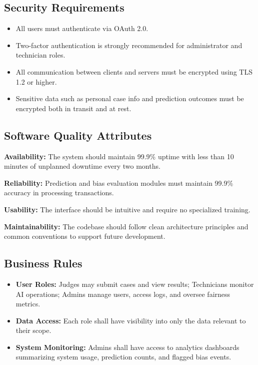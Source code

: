 \documentclass[12pt]{article}
\begin{document}
\subsection{Security Requirements}
\begin{itemize}
    \item All users must authenticate via OAuth 2.0.
    \item Two-factor authentication is strongly recommended for administrator and technician roles.
    \item All communication between clients and servers must be encrypted using TLS 1.2 or higher.
    \item Sensitive data such as personal case info and prediction outcomes must be encrypted both in transit and at rest.
\end{itemize}

\subsection{Software Quality Attributes}
\textbf{Availability:} The system should maintain 99.9\% uptime with less than 10 minutes of unplanned downtime every two months.

\textbf{Reliability:} Prediction and bias evaluation modules must maintain 99.9\% accuracy in processing transactions.

\textbf{Usability:} The interface should be intuitive and require no specialized training.

\textbf{Maintainability:} The codebase should follow clean architecture principles and common conventions to support future development.

\subsection{Business Rules}
\begin{itemize}
    \item \textbf{User Roles:} Judges may submit cases and view results; Technicians monitor AI operations; Admins manage users, access logs, and oversee fairness metrics.
    \item \textbf{Data Access:} Each role shall have visibility into only the data relevant to their scope.
    \item \textbf{System Monitoring:} Admins shall have access to analytics dashboards summarizing system usage, prediction counts, and flagged bias events.
\end{itemize}
\end{document}
